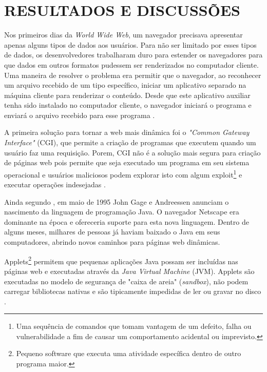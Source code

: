 \section{RESULTADOS E DISCUSSÕES}


Nos primeiros dias da \emph{World Wide Web}, um navegador precisava apresentar apenas alguns tipos de dados aos usuários. Para não ser limitado por esses tipos de dados, os desenvolvedores trabalharam duro para estender os navegadores para que dados em outros formatos pudessem ser renderizados no computador cliente. Uma maneira de resolver o problema era permitir que o navegador, ao reconhecer um arquivo recebido de um tipo específico, iniciar um aplicativo separado na máquina cliente para renderizar o conteúdo. Desde que este aplicativo auxiliar tenha sido instalado no computador cliente, o navegador iniciará o programa e enviará o arquivo recebido para esse programa \cite{zammetti2007brief}.

A primeira solução para tornar a web mais dinâmica foi o \emph{"Common Gateway Interface"} (CGI), que permite a criação de programas que executem quando um usuário faz uma requisição. Porem, CGI não é a solução mais segura para criação de páginas web pois permite que seja executado um programa em seu sistema operacional e usuários maliciosos podem explorar isto com algum exploit\footnote{Uma sequência de comandos que tomam vantagem de um defeito, falha ou vulnerabilidade a fim de causar um comportamento acidental ou imprevisto.} e executar operações indesejadas \cite{Asleson2006}.

Ainda segundo , em maio de 1995 John Gage e Andreessen anunciam o nascimento da linguagem de programação Java. O navegador Netscape era dominante na época e ofereceria suporte para esta nova linguagem. Dentro de alguns meses, milhares de pessoas já haviam baixado o Java em seus computadores, abrindo novos caminhos para páginas web dinâmicas.

Applets\footnote{Pequeno software que executa uma atividade específica dentro de outro programa maior.} permitem que pequenas aplicações Java possam ser incluídas nas páginas web e executadas através da \emph{Java Virtual Machine} (JVM). Applets são executadas no modelo de segurança de "caixa de areia" (\emph{sandbox}), não podem carregar bibliotecas nativas e são tipicamente impedidas de ler ou gravar no disco \cite{Asleson2006}.


